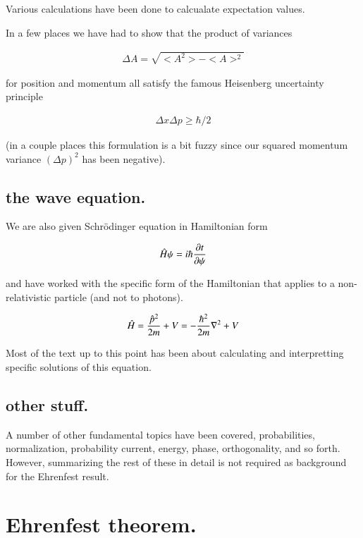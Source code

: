 \documentclass{article}
\begin{document}
Various calculations have been done to calcualate expectation values.

In a few places we have had to show that the product of variances

\begin{align*}
\Delta A = \sqrt{<A^2> - <A>^2}
\end{align*}

for position and momentum all satisfy the famous Heisenberg uncertainty
principle

\begin{align*}
\Delta x \Delta p \ge \hbar/2
\end{align*}

(in a couple places this formulation is a bit fuzzy since our squared
momentum variance $(\Delta p)^2$ has been negative).

\subsection{ the wave equation. }

We are also given Schr\"{o}dinger equation in Hamiltonian form

\begin{align*}
\hat{H} \psi = i \hbar \frac{\partial{t}}{\partial {\psi}}
\end{align*}

and have worked with the specific form of the Hamiltonian that applies to
a non-relativistic particle (and not to photons).

\begin{align*}
\hat{H} = \frac{\hat{p}^2}{2m} + V = -\frac{\hbar^2}{2m} \nabla^2 + V
\end{align*}

Most of the text up to this point has been about calculating and interpretting
specific solutions of this equation.

\subsection{ other stuff. }

A number of other fundamental topics have been covered, probabilities, normalization, probability current, energy, phase, orthogonality, and so forth.  However, summarizing the rest of these in detail is not required as 
background for the Ehrenfest result.

\section{ Ehrenfest theorem. }
\end{document}
